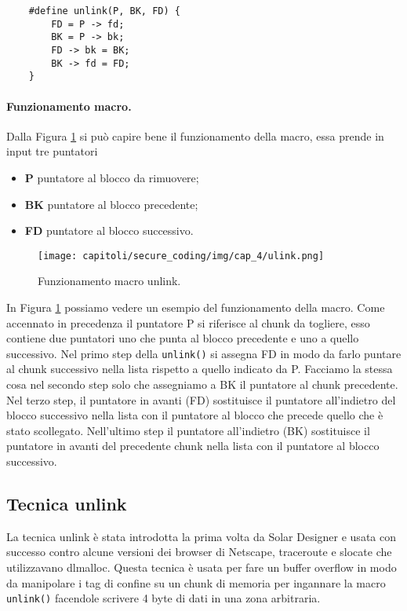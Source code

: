 \begin{verbatim}
    #define unlink(P, BK, FD) {
        FD = P -> fd;
        BK = P -> bk;
        FD -> bk = BK;
        BK -> fd = FD;
    }
\end{verbatim}


\paragraph{Funzionamento macro.}
Dalla Figura \ref{fig:ulink} si può capire bene il funzionamento della macro,
essa prende in input tre puntatori

\begin{itemize}
    \item \textbf{P} puntatore al blocco da rimuovere;
    \item \textbf{BK} puntatore al blocco precedente;
    \item \textbf{FD} puntatore al blocco successivo.
\end{itemize}

\begin{figure}[H]
    \centering
    \texttt{[image: capitoli/secure\_coding/img/cap\_4/ulink.png]}
    \caption{Funzionamento macro unlink.}\label{fig:ulink}
\end{figure}

In Figura \ref{fig:ulink} possiamo vedere un esempio del funzionamento della macro. Come accennato in precedenza il puntatore P si riferisce al chunk da togliere, esso contiene due puntatori uno che punta al blocco precedente e uno a quello successivo. Nel primo step della \verb|unlink()| si assegna FD in modo da farlo puntare al chunk successivo nella lista rispetto a quello indicato da P. Facciamo la stessa cosa nel secondo step solo che assegniamo a BK il puntatore al chunk precedente. Nel terzo step, il puntatore in avanti (FD)  sostituisce il puntatore all'indietro del blocco successivo nella lista con il puntatore al blocco che precede quello che è stato scollegato. Nell'ultimo step il puntatore all'indietro (BK) sostituisce il puntatore in avanti del precedente chunk nella lista con il puntatore al blocco successivo.

\subsection{Tecnica unlink}

La tecnica unlink è stata introdotta la prima volta da Solar Designer e usata con
successo contro alcune versioni dei browser di Netscape, traceroute e slocate che
utilizzavano dlmalloc. Questa tecnica è usata per fare un buffer overflow in modo da
manipolare i tag di confine su un chunk di memoria per ingannare la macro \verb|unlink()|
facendole scrivere 4 byte di dati in una zona arbitraria.

